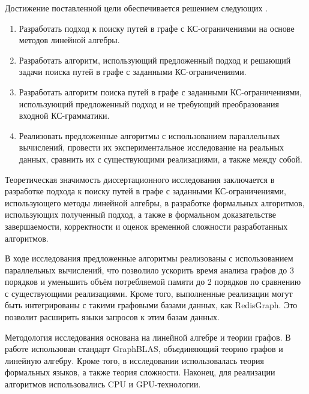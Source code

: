 Достижение поставленной цели обеспечивается решением следующих {\tasks}.
\begin{enumerate}[beginpenalty=10000] %
  \item Разработать подход к поиску путей в графе с КС-ограничениями на основе методов линейной алгебры.
  \item Разработать алгоритм, использующий предложенный подход и решающий задачи поиска путей в графе с заданными КС-ограничениями.
  \item Разработать алгоритм поиска путей в графе с заданными КС-ограничениями, использующий предложенный подход и не требующий преобразования входной КС-грамматики.
  \item Реализовать предложенные алгоритмы с использованием параллельных вычислений, провести их экспериментальное исследование на реальных данных, сравнить их с существующими реализациями, а также между собой.
\end{enumerate}


{\influence} 
Теоретическая значимость диссертационного исследования заключается в разработке подхода к поиску путей в графе с заданными КС-ограничениями, использующего методы линейной алгебры, в разработке формальных алгоритмов, использующих полученный подход, а также в формальном доказательстве завершаемости, корректности и оценок временной сложности разработанных алгоритмов.

В ходе исследования предложенные алгоритмы реализованы с использованием параллельных вычислений, что позволило ускорить время анализа графов до 3 порядков и уменьшить объём потребляемой памяти до 2 порядков по сравнению с существующими реализациями. Кроме того, выполненные реализации могут быть интегрированы с такими графовыми базами данных, как RedisGraph. Это позволит расширить языки запросов к этим базам данных.

{\methods} Методология исследования основана на линейной алгебре и теории графов. В работе использован стандарт GraphBLAS, объединяющий теорию графов и линейную алгебру. Кроме того, в исследовании использовалась теория формальных языков, а также теория сложности. Наконец, для реализации алгоритмов использовались CPU и GPU-технологии. %

